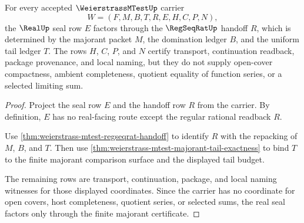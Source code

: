 \begin{theorem}
\label{thm:weierstrass-mtest-real-seal-factorization}
For every accepted $\WeierstrassMTestUp$ carrier
$$
W=(F,M,B,T,R,E,H,C,P,N),
$$
the $\RealUp$ seal row $E$ factors through the $\RegSeqRatUp$ handoff $R$, which is determined by the majorant packet $M$, the domination ledger $B$, and the uniform tail ledger $T$. The rows $H$, $C$, $P$, and $N$ certify transport, continuation readback, package provenance, and local naming, but they do not supply open-cover compactness, ambient completeness, quotient equality of function series, or a selected limiting sum.
\end{theorem}
\begin{proof}
Project the seal row $E$ and the handoff row $R$ from the carrier. By definition, $E$ has no real-facing route except the regular rational readback $R$.

Use \autoref{thm:weierstrass-mtest-regseqrat-handoff} to identify $R$ with the repacking of $M$, $B$, and $T$. Then use \autoref{thm:weierstrass-mtest-majorant-tail-exactness} to bind $T$ to the finite majorant comparison surface and the displayed tail budget.

The remaining rows are transport, continuation, package, and local naming witnesses for those displayed coordinates. Since the carrier has no coordinate for open covers, host completeness, quotient series, or selected sums, the real seal factors only through the finite majorant certificate.
\end{proof}

